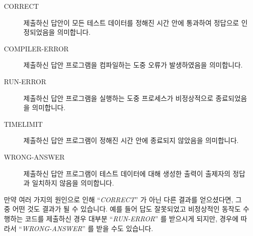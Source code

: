 \begin{description}
\item[CORRECT] 제출하신 답안이 모든 테스트 데이터를 정해진 시간 안에 통과하여 정답으로 인정되었음을 의미합니다.
\item[COMPILER-ERROR] 제출하신 답안 프로그램을 컴파일하는 도중 오류가 발생하였음을 의미합니다.
\item[RUN-ERROR] 제출하신 답안 프로그램을 실행하는 도중 프로세스가 비정상적으로 종료되었음을 의미합니다.
\item[TIMELIMIT] 제출하신 답안 프로그램이 정해진 시간 안에 종료되지 않았음을 의미합니다.
\item[WRONG-ANSWER] 제출하신 답안 프로그램이 테스트 데이터에 대해 생성한 출력이 출제자의 정답과 일치하지 않음을 의미합니다.
\end{description}

만약 여러 가지의 원인으로 인해 ``\emph{CORRECT}'' 가 아닌 다른 결과를 얻으셨다면, 그 중 어떤 것도 결과가 될 수 있습니다.
예를 들어 답도 잘못되었고 비정상적인 동작도 수행하는 코드를 제출하신 경우 대부분 ``\emph{RUN-ERROR}'' 를 받으시게 되지만, 경우에 따라서 ``\emph{WRONG-ANSWER}'' 를 받을 수도 있습니다.

\clearpage
